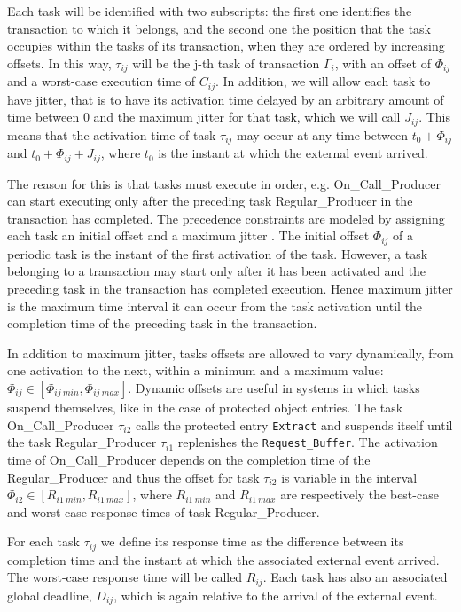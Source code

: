 \documentclass{article}
\begin{document}
Each task will be identified with two subscripts: the first one identifies the transaction to which it belongs, and the second one the position that the task occupies within the tasks of its transaction, when they are ordered by increasing offsets. In this way, $\tau_{ij}$ will be the j-th task of transaction $\Gamma_i$, with an offset of $\Phi_{ij}$ and a worst-case execution time of $C_{ij}$. In addition, we will allow each task to have jitter, that is to have its activation time delayed by an arbitrary amount of time between 0 and the maximum jitter for that task, which we will call $J_{ij}$. This means that the activation time of task $\tau_{ij}$ may occur at any time between $t_0 + \Phi_{ij}$ and $t_0 + \Phi_{ij} + J_{ij}$, where $t_0$ is the instant at which the external event arrived.

The reason for this is that tasks must execute in order, e.g. On\_Call\_Producer can start executing only after the preceding task Regular\_Producer in the transaction has completed. The precedence constraints are modeled by assigning each task an initial offset and a maximum jitter \cite{tindell-offsets}. The initial offset $\Phi_{ij}$ of a periodic task is the instant of the first activation of the task. However, a task belonging to a transaction may start only after it has been activated and the preceding task in the transaction has completed execution. Hence maximum jitter is the maximum time interval it can occur from the task activation until the completion time of the preceding task in the transaction.

In addition to maximum jitter, tasks offsets are allowed to vary dynamically, from one activation to the next, within a minimum and a maximum value: $\Phi_{ij} \in [\Phi_{ij\ min}, \Phi_{ij\ max}]$. Dynamic offsets are useful in systems in which tasks suspend themselves, like in the case of protected object entries. The task On\_Call\_Producer $\tau_{i2}$ calls the protected entry \texttt{Extract} and suspends itself until the task Regular\_Producer $\tau_{i1}$ replenishes the \texttt{Request\_Buffer}. The activation time of On\_Call\_Producer depends on the completion time of the Regular\_Producer and thus the offset for task $\tau_{i2}$ is variable in the interval $\Phi_{i2} \in [R_{i1\ min}, R_{i1\ max}]$, where $R_{i1\ min}$ and $R_{i1\ max}$ are respectively the best-case and worst-case response times of task Regular\_Producer.

For each task $\tau_{ij}$ we define its response time as the difference between its completion time and the instant at which the associated external event arrived. The worst-case response time will be called $R_{ij}$. Each task has also an associated global deadline, $D_{ij}$, which is again relative to the arrival of the external event.
\end{document}

